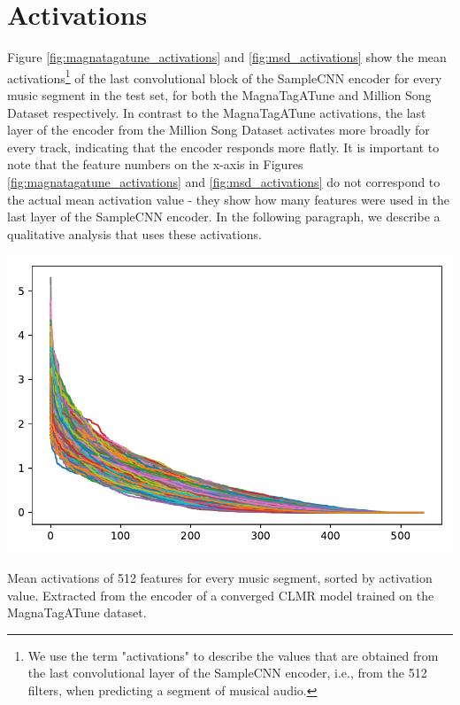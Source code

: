 \section{Activations}
\label{sec:activations}
Figure \ref{fig:magnatagatune_activations} and \ref{fig:msd_activations} show the mean activations\footnote{We use the term "activations" to describe the values that are obtained from the last convolutional layer of the SampleCNN encoder, i.e., from the 512 filters, when predicting a segment of musical audio.} of the last convolutional block of the SampleCNN encoder for every music segment in the test set, for both the MagnaTagATune and Million Song Dataset respectively. In contrast to the MagnaTagATune activations, the last layer of the encoder from the Million Song Dataset activates more broadly for every track, indicating that the encoder responds more flatly. It is important to note that the feature numbers on the x-axis in Figures \ref{fig:magnatagatune_activations} and \ref{fig:msd_activations} do not correspond to the actual mean activation value - they show how many features were used in the last layer of the SampleCNN encoder. In the following paragraph, we describe a qualitative analysis that uses these activations.

\begin{marginfigure}
    \includegraphics[width=\textwidth]{figs/activations.pdf}
    \caption{Mean activations of 512 features for every music segment, sorted by activation value. Extracted from the encoder of a converged CLMR model trained on the MagnaTagATune dataset.}
    \label{fig:magnatagatune_activations}
\end{marginfigure}

